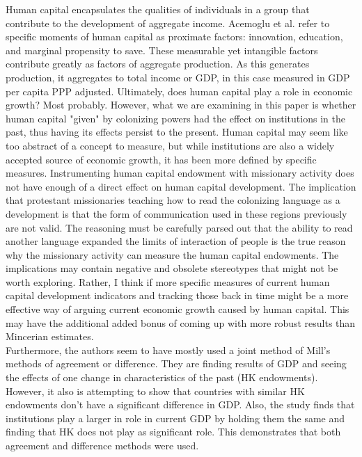 \documentclass[12pt]{article}
\begin{document}
{Human capital encapsulates the qualities of individuals in a group that contribute to the development of aggregate income. Acemoglu et al. refer to specific moments of human capital as proximate factors: innovation, education, and marginal propensity to save. These measurable yet intangible factors contribute greatly as factors of aggregate production. As this generates production, it aggregates to total income or GDP, in this case measured in GDP per capita PPP adjusted. Ultimately, does human capital play a role in economic growth? Most probably. However, what we are examining in this paper is whether human capital "given" by colonizing powers had the effect on institutions in the past, thus having its effects persist to the present. Human capital may seem like too abstract of a concept to measure, but while institutions are also a widely accepted source of economic growth, it has been more defined by specific measures. Instrumenting human capital endowment with missionary activity does not have enough of a direct effect on human capital development. The implication that protestant missionaries teaching how to read the colonizing language as a development is that the form of communication used in these regions previously are not valid. The reasoning must be carefully parsed out that the ability to read another language expanded the limits of interaction of people is the true reason why the missionary activity can measure the human capital endowments. The implications may contain negative and obsolete stereotypes that might not be worth exploring. Rather, I think if more specific measures of current human capital development indicators and tracking those back in time might be a more effective way of arguing current economic growth caused by human capital. This may have the additional added bonus of coming up with more robust results than Mincerian estimates.\\

Furthermore, the authors seem to have mostly used a joint method of Mill’s methods of agreement or difference. They are finding results of GDP and seeing the effects of one change in characteristics of the past (HK endowments). However, it also is attempting to show that countries with similar HK endowments don’t have a significant difference in GDP. Also, the study finds that institutions play a larger in role in current GDP by holding them the same and finding that HK does not play as significant role. This demonstrates that both agreement and difference methods were used.\\

}
\end{document}
